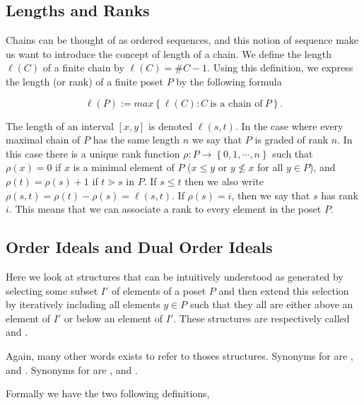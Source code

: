 \subsection{Lengths and Ranks}

Chains can be thought of as ordered sequences, and this notion of sequence make us want to introduce the concept of length of a chain. We define the length $\ell(C)$ of a finite chain by $\ell(C) = \#C - 1$. Using this definition, we express the length (or rank) of a finite poset $P$ by the following formula

$$\ell(P) := max\left\{{\ell(C) : C ~\text{is a chain of}~ P}\right\}.$$

The length of an interval $[x, y]$ is denoted $\ell(s, t)$. In the case where every maximal chain of $P$ has the same length $n$ we say that $P$ is graded of rank $n$. In this case there is a unique rank function $\rho : P \to \left\{{0, 1, \cdots , n}\right\}$ such that $\rho(x) = 0$ if $x$ is a minimal element of $P$ ($x \le y$ or $y \nleq x$ for all $y \in P$), and $\rho(t) = \rho(s) + 1$ if $t \gtrdot s$ in $P$. If $s \le t$ then we also write $\rho(s, t) = \rho(t) - \rho(s) = \ell(s, t)$. If $\rho(s) = i$, then we say that $s$ has rank $i$. This means that we can associate a rank to every element in the poset $P$.


\subsection{Order Ideals and Dual Order Ideals}

Here we look at structures that can be intuitively understood as generated by selecting some subset $I'$ of elements of a poset $P$ and then extend this selection by iteratively including all elements $y \in P$ such that they all are either above an element of $I'$ or below an element of $I'$. These structures are respectively called  and .

Again, many other words exists to refer to thoses structures. Synonyms for  are ,  and . Synonyms for  are ,  and .

Formally we have the two following definitions,



